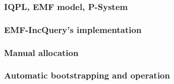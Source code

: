 \subsubsection{IQPL, EMF model, P-System}

\subsubsection{EMF-IncQuery's implementation}

\subsubsection{Manual allocation}

\subsubsection{Automatic bootstrapping and operation}


